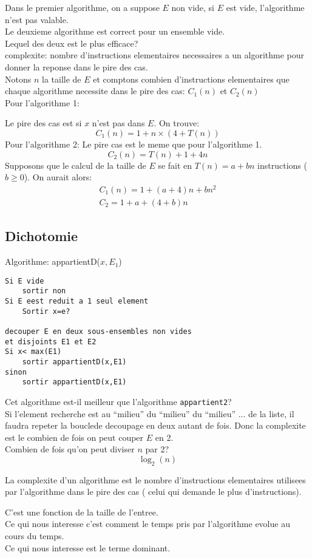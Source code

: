 \documentclass[../main.tex]{subfiles}
\begin{document}
Dans le premier algorithme, on a suppose $E$ non vide, si $E$ est vide, l'algorithme n'est pas valable.\\
Le deuxieme algorithme est correct pour un ensemble vide.\\

Lequel des deux est le plus efficace?\\
complexite: nombre d'instructions elementaires necessaires a un algorithme pour donner la reponse dans le pire des cas.\\

Notons $n$ la taille de $E$ et comptons combien d'instructions elementaires que chaque algorithme necessite dans le pire des cas: $ C_1(n)$ et $ C_2(n)$\\
Pour l'algorithme 1:

Le pire des cas est si $x$ n'est pas dans $E$. On trouve:
\[ 
	C_1(n)= 1+ n \times(4+T(n))
\]
Pour l'algorithme 2:
Le pire cas est le meme que pour l'algorithme 1.
\[ 
	C_2(n)= T(n) + 1 + 4n
\]
Supposons que le calcul de la taille de $E$ se fait en $ T(n)=a + bn$
instructions ( $b\geq 0$).
On aurait alors:
\begin{align*}
	C_1(n)=1 + ( a+4)n + bn^{2}\\
	C_{2} = 1 + a + ( 4+b)n	
\end{align*}
\subsection{Dichotomie}

Algorithme: appartientD($x,E_1$)
\begin{lstlisting}
Si E vide
	sortir non
Si E eest reduit a 1 seul element
	Sortir x=e?

decouper E en deux sous-ensembles non vides
et disjoints E1 et E2
Si x< max(E1)
	sortir appartientD(x,E1)
sinon 
	sortir appartientD(x,E1)
\end{lstlisting}
Cet algorithme est-il meilleur que l'algorithme \texttt{appartient2}? \\
Si l'element recherche est au ``milieu''  du ``milieu'' du ``milieu'' ... de la liste, il faudra repeter la bouclede decoupage en deux autant de fois.
Donc la complexite est le combien de fois on peut couper $E$ en 2.\\
Combien de fois qu'on peut diviser $n$ par 2?
\[ 
	\log_2(n)
\]
\begin{defn}
	La complexite d'un algorithme est le nombre d'instructions elementaires utilisees par l'algorithme dans le pire des cas ( celui qui demande le plus d'instructions).
\end{defn}
C'est une fonction de la taille de l'entree.\\
Ce qui nous interesse c'est comment le temps pris par l'algorithme evolue au cours du temps.\\
Ce qui nous interesse est le terme dominant.
\end{document}
